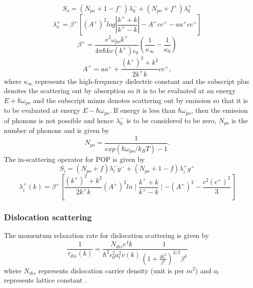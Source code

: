 \documentclass[12pt]{article}
\begin{document}
\begin{equation}
S_{o} = ( N_{po} + 1 - \textit{f}^- ) \lambda^{-}_0 + ( N_{po} + \textit{f}^+) \lambda^{+}_0 
\label{So}
\end{equation}
\begin{equation}
\lambda^+_{o} = \beta^+[(A^+)^2 log \left| \frac{k^+ + k}{k^+ - k}\right| - A^+ c c^+ - aa^+cc^+] 
\label{lambda0}
\end{equation}
\begin{equation}
\beta^+ = \frac{e^2 \omega_{po} k^+ }{4 \pi \hbar k v(k^+) \epsilon_0 } \left(\frac{1}{\kappa_\infty} - \frac{1}{\kappa_0}\right)
\label{betaaaa}
\end{equation}
\begin{equation}
A^+ = aa^+ + \frac{(k^+)^2 + k^2}{2 k^+ k} cc^+,
\label{Apositive}
\end{equation}
where $\kappa_\infty$ represents the high-frequency dielectric constant and the subscript plus denotes the scattering out by absorption so it is to be evaluated at an energy $E + \hbar \omega_{po} $ and the subscript minus denotes scattering out by emission so that it is to be evaluated at energy  $E - \hbar \omega_{po} $. If energy is less than $ \hbar \omega_{po} $, then the emission of phonons is not possible and hence $\lambda^{-}_0$ is to be considered to be zero, 
$N_{po} $ is the number of phonons and is given by 
\begin{equation}
N_{po} = \frac{1}{exp(\hbar \omega_{po}/k_B T)-1} .
\label{Npo}
\end{equation}
The in-scattering operator for POP is given by \cite{rode1}
\begin{equation}
S_{i} = ( N_{po} + \textit{f} ) \lambda^{-}_i g^- + ( N_{po} + 1 - \textit{f}) \lambda^{+}_i g^+ 
\label{Si}
\end{equation}
\begin{equation}
\lambda^+_{i}(k) = \beta^+ [\frac{(k^+)^2+k^2}{2k^+k}(A^+)^2 ln\mid \frac{k^+ + k}{k^+ - k}\mid - (A^+)^2 - \frac{c^2 (c^+)^2}{3}]
\label{lambdai}
\end{equation}

\subsubsection{Dislocation scattering}
The momentum relaxation rate for dislocation scattering is given by \cite{miller}
\begin{equation}
\frac{1}{\tau_{dis}(k)} = \frac{N_{dis}e^4k}{\hbar^2 \epsilon_0^2 a_l^2v(k)} \frac{1}{(1+\frac{4k^2}{\beta^2})^{3/2}\beta^4}
\label{dislocation}
\end{equation}
where $N_{dis}$ represents dislocation carrier density (unit is per $m^2$) and $a_l$ represents lattice constant .
\end{document}

